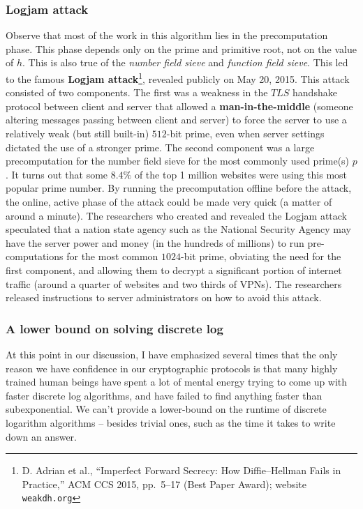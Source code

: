 \documentclass{article}
\theoremstyle{plain}
\theoremstyle{definition}
\theoremstyle{remark}
\numberwithin{theorem}{section}
\begin{document}
\subsubsection{Logjam attack}

Observe that most of the work in this algorithm lies in the precomputation phase.  This phase depends only on the prime and primitive root, not on the value of $h$.  This is also true of the \emph{number field sieve} and \emph{function field sieve}.  
This led to the famous \textbf{Logjam attack}\footnote{D. Adrian et al., ``Imperfect Forward Secrecy: How Diffie--Hellman Fails in Practice,'' ACM CCS 2015, pp.~5--17 (Best Paper Award); website \texttt{weakdh.org}}, revealed publicly on May 20, 2015.  This attack consisted of two components.  The first was a weakness in the $TLS$ handshake protocol between client and server that allowed a \textbf{man-in-the-middle} (someone altering messages passing between client and server) to force the server to use a relatively weak (but still built-in) $512$-bit prime, even when server settings dictated the use of a stronger prime.  The second component was a large precomputation for the number field sieve for the most commonly used prime(s) $p$.  It turns out that some $8.4\%$ of the top 1 million websites were using this most popular prime number.  By running the precomputation offline before the attack, the online, active phase of the attack could be made very quick (a matter of around a minute).  The researchers who created and revealed the Logjam attack speculated that a nation state agency such as the National Security Agency may have the server power and money (in the hundreds of millions) to run pre-computations for the most common $1024$-bit prime, obviating the need for the first component, and allowing them to decrypt a significant portion of internet traffic (around a quarter of websites and two thirds of VPNs).  The researchers released instructions to server administrators on how to avoid this attack.


\subsubsection{A lower bound on solving discrete log}

At this point in our discussion, I have emphasized several times that the only reason we have confidence in our cryptographic protocols is that many highly trained human beings have spent a lot of mental energy trying to come up with faster discrete log algorithms, and have failed to find anything faster than subexponential.  We can't provide a lower-bound on the runtime of discrete logarithm algorithms -- besides trivial ones, such as the time it takes to write down an answer.
\end{document}
